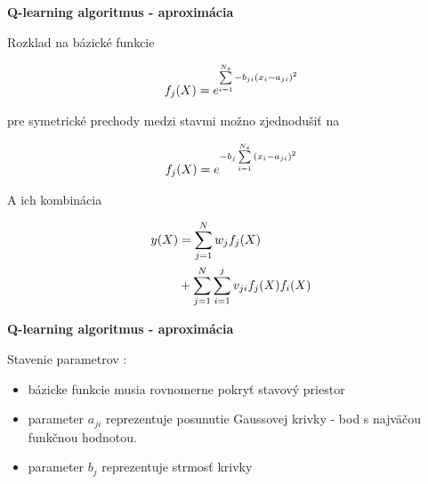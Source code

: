 \documentclass[xcolor=dvipsnames]{beamer}
\begin{document}
\begin{frame}{\bf Q-learning algoritmus - aproximácia}

Rozklad na bázické funkcie

\begin{align}
    f_j(\boldmath{X}) = e^{ \sum\limits_{i=1}^{N_s}{-b_{ji}(x_i - a_{ji})^2} }
\end{align}

pre symetrické prechody medzi stavmi možno zjednodušiť na

\begin{align}
    f_j(\boldmath{X}) = e^{ -b_j\sum\limits_{i=1}^{N_s}{(x_i - a_{ji})^2} }
\end{align}

A ich kombinácia

\begin{align}
    y(\boldmath{X})&= \sum\limits_{j=1}^{N}w_jf_j(\boldmath{X}) \nonumber \\
                  &+ \sum\limits_{j=1}^{N}{\sum\limits_{i=1}^{j}v_{ji}f_j(\boldmath{X})f_i(\boldmath{X})}
\end{align}


\end{frame}







\begin{frame}{\bf Q-learning algoritmus - aproximácia}

Stavenie parametrov :

\begin{itemize}
\item bázicke funkcie musia rovnomerne pokryť stavový priestor
\item parameter $a_{ji}$ reprezentuje posunutie Gaussovej krivky - bod s najväčou funkčnou hodnotou.
\item parameter $b_{j}$ reprezentuje strmosť krivky
\end{itemize}

\end{frame}
\end{document}
